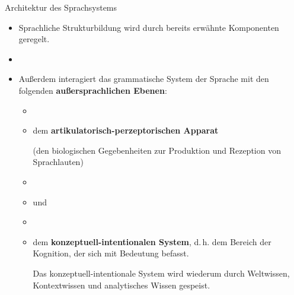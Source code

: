 \begin{frame}{Architektur des Sprachsystems}
	
	\begin{itemize}
		\item Sprachliche Strukturbildung wird durch bereits erwähnte Komponenten geregelt.
		\item[]
		\item<2-> Außerdem interagiert das grammatische System der Sprache mit den folgenden \textbf{außersprachlichen Ebenen}:
				
		\begin{itemize}
			\item[]
			\item<3-> dem \textbf{artikulatorisch-perzeptorischen Apparat}\par
				(den biologischen Gegebenheiten zur Produktion und Rezeption von Sprachlauten)
			\item[]
			\item<3->[] und
			\item[]
			\item<4-> dem \textbf{konzeptuell-intentionalen System}, d.\,h. dem Bereich der Kognition, der sich mit Bedeutung befasst.\par
				Das konzeptuell-intentionale System wird wiederum durch Weltwissen, Kontextwissen und analytisches Wissen gespeist.
		\end{itemize}
			
	\end{itemize}
		
\end{frame}



				





